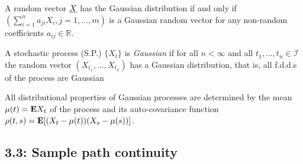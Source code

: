 \begin{proposition*}
A random vector ${\underline{X}}$ has the Gaussian distribution if and only if $(\sum_{i=1}^n a_{ji}X_i, j=1,\dots,m)$ is a Gaussian random vector for any non-random coefficients $a_{ij} \in \mathbb R$.
\end{proposition*}

\begin{definition*}
A stochastic process (S.P.) $\{X_t\}$ is \emph{Gaussian} if for all $n < \infty$ and all $t_1,\dots,t_n \in \mathcal I$ the random vector $(X_{t_1},\dots,X_{t_n})$ has a Gaussian distribution, that is, all f.d.d.s of the process are Gaussian
\end{definition*}

\begin{corollary*}
All distributional properties of Gaussian processes are determined by the mean $\mu(t) = \mathbf{E} X_t$ of the process and its auto-covariance function $\rho(t,s) = \mathbf{E}[(X_t-\mu(t))(X_s-\mu(s))]$.
\end{corollary*}

\subsection*{3.3: Sample path continuity}

